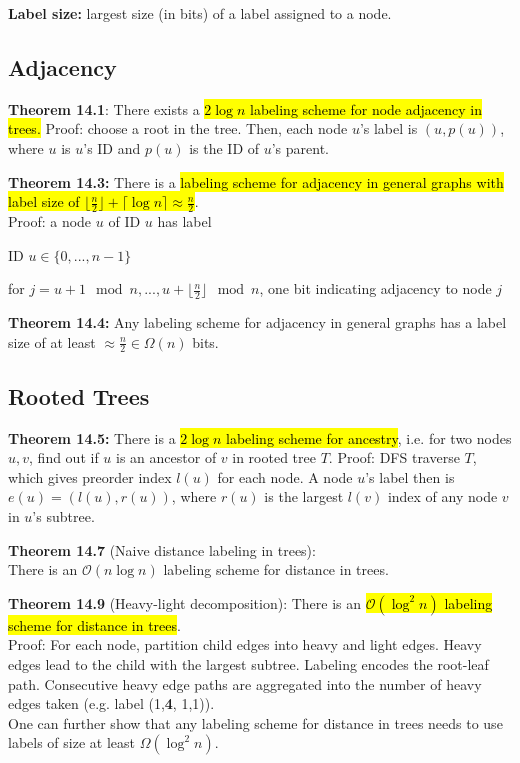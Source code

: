 \documentclass[a4paper, 8pt, landscape]{scrartcl}
\begin{document}
\begin{multicols*}{3}
\textbf{Label size:} largest size (in bits) of a label assigned to a node.

\subsection{Adjacency}

\textbf{Theorem 14.1}: There exists a \hl{$2\log n$ labeling scheme for node adjacency in trees.} Proof: choose a root in the tree. Then, each node $u$'s label is $(u, p(u))$, where $u$ is $u$'s ID and $p(u)$ is the ID of $u$'s parent.

\textbf{Theorem 14.3:} There is a \hl{labeling scheme for adjacency in general graphs with label size of $\lfloor \frac{n}{2} \rfloor + \lceil \log n \rceil \approx \frac{n}{2}$}.\\
Proof: a node $u$ of ID $u$ has label

\vspace*{-2mm}
\begin{compactitem}
\item ID $u \in \{0, ..., n-1\}$
\item for $j = u+1 \mod n, ..., u+\lfloor \frac{n}{2} \rfloor \mod n$, one bit indicating adjacency to node $j$
\end{compactitem}

\textbf{Theorem 14.4:} Any labeling scheme for adjacency in general graphs has a label size of at least $\approx \frac{n}{2} \in \Omega(n)$ bits.


\subsection{Rooted Trees}

\textbf{Theorem 14.5:} There is a \hl{$2\log n$ labeling scheme for ancestry}, i.e. for two nodes $u, v$, find out if $u$ is an ancestor of $v$ in rooted tree $T$. Proof: DFS traverse $T$, which gives preorder index $l(u)$ for each node. A node $u$'s label then is $e(u) = (l(u), r(u))$, where $r(u)$ is the largest $l(v)$ index of any node $v$ in $u$'s subtree.

\textbf{Theorem 14.7} (Naive distance labeling in trees):\\
There is an $\mathcal{O}(n \log n)$ labeling scheme for distance in trees.

\textbf{Theorem 14.9} (Heavy-light decomposition): There is an \hl{$\mathcal{O}(\log^2 n)$ labeling scheme for distance in trees}.\\
Proof: For each node, partition child edges into heavy and light edges. Heavy edges lead to the child with the largest subtree. Labeling encodes the root-leaf path. Consecutive heavy edge paths are aggregated into the number of heavy edges taken (e.g. label (1,\textbf{4}, 1,1)).\\
One can further show that any labeling scheme for distance in trees needs to use labels of size at least $\Omega(\log^2 n)$.



\end{multicols*}
\end{document}

